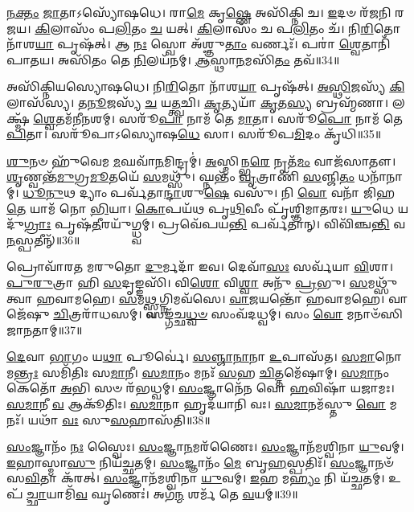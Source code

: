 \-\ul{𑌨}\-\-\ul{𑌕𑍍𑌤𑌂} \ul{𑌜𑌾}\-𑌤𑌾\-𑌽𑌸𑍍𑌯𑍋᳴𑌷𑌧𑍇।
𑌰𑌾\-\ul{𑌮𑍇} 𑌕𑍃\-\ul{𑌷𑍍𑌣𑍇} 𑌅𑌸𑌿᳴𑌕𑍍𑌨𑌿 𑌚।
\-\ul{𑌇}\-𑌦𑍞 𑌰᳴𑌜𑌨𑌿 𑌰𑌜𑌯।
\-\ul{𑌕𑌿}\-𑌲𑌾𑌸𑌂᳴ 𑌪\-\ul{𑌲𑌿}\-𑌤𑌂 \ul{𑌚} 𑌯𑌤𑍍।
\-\ul{𑌕𑌿}\-𑌲𑌾𑌸𑌂᳴ 𑌚 𑌪\-\ul{𑌲𑌿}\-𑌤𑌂 𑌚᳴।
𑌨𑌿\-\ul{𑌰𑌿}\-𑌤𑍋 𑌨𑌾᳴𑌶\-\ul{𑌯𑌾} 𑌪𑍃𑌷᳴𑌤𑍍।
𑌆 \ul{𑌨𑌃} 𑌸𑍍𑌵𑍋 𑌅᳴𑌶𑍍𑌞𑍁\-\ul{𑌤𑌾𑌂} 𑌵𑌰𑍍𑌣𑌃᳴।
𑌪𑌰𑌾॑ \ul{𑌶𑍍𑌵𑍇}\-𑌤𑌾𑌨𑌿᳴ 𑌪𑌾𑌤𑌯।
𑌅𑌸𑌿᳴𑌤𑌂 𑌤𑍇 \ul{𑌨𑌿}\-𑌲𑌯᳴𑌨𑌮𑍍।
\-\ul{𑌆}\-𑌸𑍍𑌥𑌾\-\ul{𑌨}\-𑌮𑌸𑌿᳴\-\ul{𑌤𑌂} 𑌤𑌵᳴॥34॥

𑌅𑌸𑌿᳴𑌕𑍍𑌨𑌿𑌯𑌸𑍍𑌯𑍋𑌷𑌧𑍇।
𑌨𑌿\-\ul{𑌰𑌿}\-𑌤𑍋 𑌨𑌾᳴𑌶\-\ul{𑌯𑌾} 𑌪𑍃𑌷᳴𑌤𑍍।
\-\ul{𑌅}\-\-\ul{𑌸𑍍𑌥𑌿}\-𑌜𑌸𑍍𑌯᳴ \ul{𑌕𑌿}\-𑌲𑌾𑌸᳴𑌸𑍍𑌯।
\-\ul{𑌤}\-\-\ul{𑌨𑍂}\-𑌜𑌸𑍍𑌯᳴ \ul{𑌚} 𑌯\-\ul{𑌤𑍍𑌤𑍍𑌵}\-𑌚𑌿।
\-\ul{𑌕𑍃}\-𑌤𑍍𑌯𑌯𑌾᳴ \ul{𑌕𑍃}\-𑌤\-\ul{𑌸𑍍𑌯} 𑌬𑍍𑌰𑌹𑍍𑌮᳴𑌣𑌾।
𑌲𑌕𑍍𑌷𑍍𑌮᳴ \ul{𑌶𑍍𑌵𑍇}\-𑌤𑌮᳴𑌨𑍀𑌨𑌶𑌮𑍍।
𑌸𑌰𑍂᳴\-\ul{𑌪𑌾} 𑌨𑌾𑌮᳴ 𑌤𑍇 \ul{𑌮𑌾}\-𑌤𑌾।
𑌸𑌰𑍂᳴\-\ul{𑌪𑍋} 𑌨𑌾𑌮᳴ 𑌤𑍇 \ul{𑌪𑌿}\-𑌤𑌾।
𑌸𑌰𑍂᳴𑌪𑌾\-𑌽𑌸𑍍𑌯𑍋𑌷\-\ul{𑌧𑍇} 𑌸𑌾।
𑌸𑌰𑍂᳴𑌪\-\ul{𑌮𑌿}\-𑌦𑌂 𑌕𑍃᳴𑌧𑌿॥35॥

\-\ul{𑌶𑍁}\-𑌨𑍞 𑌹𑍁᳴𑌵𑍇𑌮 \ul{𑌮}\-𑌘𑌵𑌾᳴\-\ul{𑌨}\-𑌮𑌿𑌨𑍍𑌦𑍍𑌰𑌮𑍍॑।
\-\ul{𑌅}\-𑌸𑍍𑌮𑌿𑌨𑍍𑌭\-\ul{𑌰𑍇} 𑌨𑍃𑌤᳴\-\ul{𑌮𑌂} 𑌵𑌾𑌜᳴𑌸𑌾𑌤𑍗।
\-\ul{𑌶𑍃}\-𑌣𑍍𑌵𑌨𑍍𑌤᳴\-\ul{𑌮𑍁}\-𑌗𑍍𑌰\-\ul{𑌮𑍂}\-𑌤𑌯𑍇᳴ \ul{𑌸}\-𑌮𑌥𑍍𑌸𑍁᳴।
𑌘𑍍𑌨𑌨𑍍𑌤𑌂᳴ \ul{𑌵𑍃}\-𑌤𑍍𑌰𑌾𑌣𑌿᳴ \ul{𑌸}\-𑌞𑍍𑌜𑌿\-\ul{𑌤𑌂} 𑌧𑌨𑌾᳴𑌨𑌾𑌮𑍍।
\-\ul{𑌧𑍂}\-\-\ul{𑌨𑍁}\-𑌥 𑌦𑍍𑌯𑌾𑌂 𑌪𑌰𑍍𑌵᳴𑌤𑌾\-\ul{𑌨𑍍𑌦𑌾}\-𑌶𑍁\-\ul{𑌷𑍇} 𑌵𑌸𑍁᳴।
𑌨𑌿 \ul{𑌵𑍋} 𑌵𑌨𑌾᳴ 𑌜𑌿𑌹\-\ul{𑌤𑍇} 𑌯𑌾𑌮᳴ 𑌨𑍋 \ul{𑌭𑌿}\-𑌯𑌾।
\-\ul{𑌕𑍋}\-𑌪𑌯᳴𑌥 𑌪𑍃\-\ul{𑌥𑌿}\-𑌵𑍀𑌂 𑌪𑍃᳴𑌶𑍍𑌞𑌿𑌮𑌾𑌤𑌰𑌃।
\-\ul{𑌯𑍁}\-𑌧𑍇 𑌯𑌦𑍁᳴\-\ul{𑌗𑍍𑌰𑌾𑌃} 𑌪𑍃𑌷᳴\-\ul{𑌤𑍀}\-𑌰𑌯𑍁᳴𑌗𑍍𑌧𑍍𑌵𑌮𑍍।
𑌪𑍍𑌰𑌵𑍇᳴𑌪𑌯\-\ul{𑌨𑍍𑌤𑌿} 𑌪𑌰𑍍𑌵᳴𑌤𑌾𑌨𑍍।
𑌵𑌿𑌵𑌿᳴𑌞𑍍𑌚\-\ul{𑌨𑍍𑌤𑌿} 𑌵\-\ul{𑌨}\-𑌸𑍍𑌪𑌤𑍀𑌨𑍍᳴॥36॥

𑌪𑍍𑌰𑍋𑌵𑌾᳴𑌰𑌤 𑌮𑌰𑍁𑌤𑍋 \ul{𑌦𑍁}\-𑌰𑍍𑌮𑌦𑌾᳴ 𑌇𑌵।
𑌦𑍇𑌵𑌾᳴\-\ul{𑌸𑌃} 𑌸𑌰𑍍𑌵᳴𑌯𑌾 \ul{𑌵𑌿}\-𑌶𑌾।
\-\ul{𑌪𑍁}\-\-\ul{𑌰𑍁}\-𑌤𑍍𑌰𑌾 𑌹𑌿 \ul{𑌸}\-𑌦𑍃𑌙𑍍𑌙𑌸𑌿᳴।
𑌵𑌿\-\ul{𑌶𑍋} 𑌵𑌿\-\ul{𑌶𑍍𑌵𑌾} 𑌅𑌨𑍁᳴ \ul{𑌪𑍍𑌰}\-𑌭𑍁।
\-\ul{𑌸}\-𑌮𑌥𑍍𑌸𑍁᳴ 𑌤𑍍𑌵𑌾 𑌹𑌵𑌾𑌮𑌹𑍇।
\-\ul{𑌸}\-𑌮\-\ul{𑌥𑍍𑌸𑍍𑌵}\-𑌗𑍍𑌨𑌿𑌮𑌵᳴𑌸𑍇।
\-\ul{𑌵𑌾}\-\-\ul{𑌜}\-𑌯𑌨𑍍𑌤𑍋᳴ 𑌹𑌵𑌾𑌮𑌹𑍇।
𑌵𑌾𑌜𑍇᳴𑌷𑍁 \ul{𑌚𑌿}\-𑌤𑍍𑌰𑌰𑌾᳴𑌧𑌸𑌮𑍍।
𑌸𑌙𑍍𑌗᳴𑌚𑍍𑌛\-\ul{𑌧𑍍𑌵}\-\-\ul{𑍞} 𑌸𑌂𑌵᳴𑌦𑌧𑍍𑌵𑌮𑍍।
𑌸𑌂 \ul{𑌵𑍋} 𑌮𑌨𑌾𑍞᳴𑌸𑌿 𑌜𑌾𑌨𑌤𑌾𑌮𑍍॥37॥

\-\ul{𑌦𑍇}\-𑌵𑌾 \ul{𑌭𑌾}\-𑌗𑌂 𑌯\-\ul{𑌥𑌾} 𑌪𑍂𑌰𑍍𑌵𑍇॑।
\-\ul{𑌸}\-\-\ul{𑌞𑍍𑌜𑌾}\-\-\ul{𑌨𑌾}\-𑌨𑌾 \ul{𑌉}\-𑌪𑌾𑌸᳴𑌤।
\-\ul{𑌸}\-\-\ul{𑌮𑌾}\-𑌨𑍋 𑌮\-\ul{𑌨𑍍𑌤𑍍𑌰𑌃} 𑌸𑌮𑌿᳴𑌤𑌿𑌃 𑌸\-\ul{𑌮𑌾}\-𑌨𑍀।
\-\ul{𑌸}\-\-\ul{𑌮𑌾}\-𑌨𑌂 𑌮𑌨𑌃᳴ \ul{𑌸}\-𑌹 \ul{𑌚𑌿}\-𑌤𑍍𑌤𑌮𑍇᳴𑌷𑌾𑌮𑍍।
\-\ul{𑌸}\-\-\ul{𑌮𑌾}\-𑌨𑌂 𑌕𑍇𑌤𑍋᳴ \ul{𑌅}\-𑌭𑌿 𑌸𑍞 𑌰᳴𑌭𑌧𑍍𑌵𑌮𑍍।
\-\ul{𑌸𑌂}\-𑌜𑍍𑌞𑌾𑌨𑍇᳴𑌨 𑌵𑍋 \ul{𑌹}\-𑌵𑌿𑌷𑌾᳴ 𑌯𑌜𑌾𑌮𑌃।
\-\ul{𑌸}\-\-\ul{𑌮𑌾}\-𑌨𑍀 \ul{𑌵} 𑌆𑌕𑍂᳴𑌤𑌿𑌃।
\-\ul{𑌸}\-\-\ul{𑌮𑌾}\-𑌨𑌾 𑌹𑍃𑌦᳴𑌯𑌾𑌨𑌿 𑌵𑌃।
\-\ul{𑌸}\-\-\ul{𑌮𑌾}\-𑌨𑌮᳴𑌸𑍍𑌤𑍁 \ul{𑌵𑍋} 𑌮𑌨𑌃᳴।
𑌯𑌥𑌾᳴ \ul{𑌵𑌃} 𑌸𑍁\-\ul{𑌸}\-𑌹𑌾𑌸᳴𑌤𑌿॥38॥

\-\ul{𑌸𑌂}\-𑌜𑍍𑌞𑌾𑌨𑌂᳴ \ul{𑌨𑌃} 𑌸𑍍𑌵𑍈𑌃।
\-\ul{𑌸𑌂}\-𑌜𑍍𑌞𑌾\-\ul{𑌨}\-𑌮𑌰᳴𑌣𑍈𑌃।
\-\ul{𑌸𑌂}\-𑌜𑍍𑌞𑌾𑌨᳴𑌮𑌶𑍍𑌵𑌿𑌨𑌾 \ul{𑌯𑍁}\-𑌵𑌮𑍍।
\-\ul{𑌇}\-𑌹𑌾𑌸𑍍𑌮𑌾\-\ul{𑌸𑍁} 𑌨𑌿𑌯᳴𑌚𑍍𑌛𑌤𑌮𑍍।
\-\ul{𑌸𑌂}\-𑌜𑍍𑌞𑌾𑌨𑌂᳴ \ul{𑌮𑍇} 𑌬𑍃\-\ul{𑌹}\-𑌸𑍍𑌪𑌤𑌿𑌃᳴।
\-\ul{𑌸𑌂}\-𑌜𑍍𑌞𑌾𑌨𑍞᳴ 𑌸\-\ul{𑌵𑌿}\-𑌤𑌾 𑌕᳴𑌰𑌤𑍍।
\-\ul{𑌸𑌂}\-𑌜𑍍𑌞𑌾𑌨᳴𑌮𑌶𑍍𑌵𑌿𑌨𑌾 \ul{𑌯𑍁}\-𑌵𑌮𑍍।
\-\ul{𑌇}\-𑌹 𑌮\-\ul{𑌹𑍍𑌯𑌂} 𑌨𑌿 𑌯᳴𑌚𑍍𑌛𑌤𑌮𑍍।
𑌉𑌪᳴ \ul{𑌚𑍍𑌛𑌾}\-𑌯𑌾𑌮𑌿᳴\-\ul{𑌵} 𑌘𑍃𑌣𑍇𑌃॑।
𑌅𑌗᳴\-\ul{𑌨𑍍𑌮} 𑌶𑌰𑍍𑌮᳴ 𑌤𑍇 \ul{𑌵}\-𑌯𑌮𑍍॥39॥

